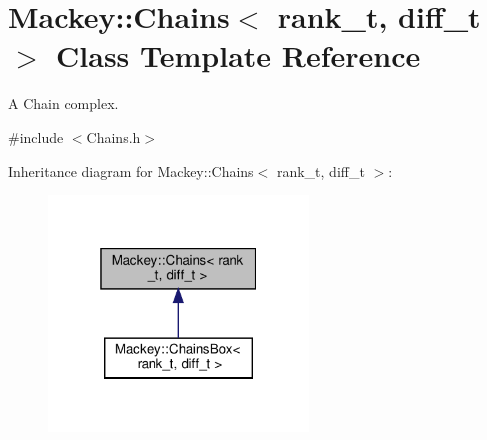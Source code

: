 \hypertarget{classMackey_1_1Chains}{}\section{Mackey\+:\+:Chains$<$ rank\+\_\+t, diff\+\_\+t $>$ Class Template Reference}
\label{classMackey_1_1Chains}


A Chain complex.  




{\ttfamily \#include $<$Chains.\+h$>$}



Inheritance diagram for Mackey\+:\+:Chains$<$ rank\+\_\+t, diff\+\_\+t $>$\+:\nopagebreak
\begin{figure}[H]
\begin{center}
\leavevmode
\includegraphics[width=196pt]{classMackey_1_1Chains__inherit__graph}
\end{center}
\end{figure}
